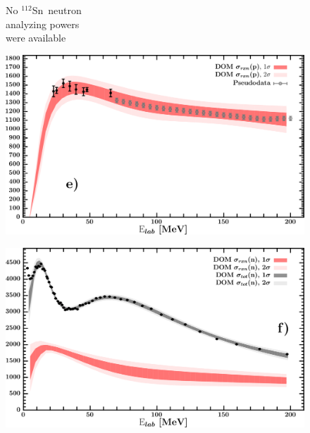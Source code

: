 \documentclass[twocolumn,secnumarabic,amssymb, nobibnotes, aps, prl,
superscriptaddress, nobalancelastpage, draft]{revtex4}
\newcommand{\snTwelve}{\ensuremath{^{112}}S\lowercase{n}}
\begin{document}
\begin{figure}[!htb]
\begin{minipage}{0.4\linewidth}
\begin{minipage}[c]{0.5\linewidth}
        \end{minipage}
        \begin{minipage}[c]{0.45\linewidth}
            \centering
            No \snTwelve\ neutron \\
            analyzing powers \\
            were available
        \end{minipage}
        \label{DOM_sn112_neutron_elastic}
    \end{minipage}

    \vspace{10pt}

    \centering
    \begin{minipage}{0.4\linewidth}
        \centering
        \includegraphics[width=\linewidth]{figures/sn112_protonInelastic.png}
        \label{DOM_sn112_proton_inelastic}
    \end{minipage}\hspace{6pt}
    \begin{minipage}{0.4\linewidth}
        \centering
        \includegraphics[width=\linewidth]{figures/sn112_neutronInelastic.png}

\end{minipage}
\end{figure}
\end{document}
